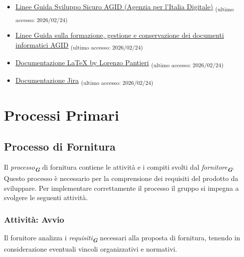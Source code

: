 \documentclass[a4paper,12pt]{article}
\newcommand{\glossario}[1]{\textit{#1}\textsubscript{\textbf{\textit{\textcolor{lightblack}{G}}}}}
\newcommand{\ped}[1]{\textsubscript{#1}}
\begin{document}
\begin{itemize}
\begin{itemize}
            \item \href{https://www.math.unipd.it/~tullio/IS-1/2025/Dispense/T10.pdf}{\ul{https://www.math.unipd.it/~tullio/IS-1/2025/Dispense/T10.pdf}} \ped{(ultimo accesso: 2026/02/24)}
            \item \href{https://www.math.unipd.it/~tullio/IS-1/2025/Dispense/T11.pdf}{\ul{https://www.math.unipd.it/~tullio/IS-1/2025/Dispense/T11.pdf}} \ped{(ultimo accesso: 2026/02/24)}
        \end{itemize}
    \item \href{https://www.agid.gov.it/it/sicurezza/cert-pa/linee-guida-sviluppo-del-software-sicuro}{\ul{Linee Guida Sviluppo Sicuro AGID (Agenzia per l'Italia Digitale)}} \ped{(ultimo accesso: 2026/02/24)}
    \item  \href{https://www.agid.gov.it/it/linee-guida#index-3}{\ul{Linee Guida sulla formazione, gestione e conservazione dei documenti informatici AGID}} \ped{(ultimo accesso: 2026/02/24)}
    \item \href{https://www.lorenzopantieri.net/LaTeX_files/LaTeXpedia.pdf}{\ul{Documentazione \LaTeX{} by Lorenzo Pantieri}} \ped{(ultimo accesso: 2026/02/24)}
    \item \href{https://confluence.atlassian.com/jira}{\ul{Documentazione Jira}} \ped{(ultimo accesso: 2026/02/24)}
\end{itemize}

\section{Processi Primari}

\subsection{Processo di Fornitura}\label{processoDiFornitura}
Il \glossario{processo} di fornitura contiene le attività e i compiti svolti
dal \glossario{fornitore}. Questo processo è necessario per la comprensione dei requisiti del prodotto da sviluppare. Per implementare correttamente il processo il gruppo
si impegna a svolgere le seguenti attività.

\subsubsection{Attività: Avvio}
Il fornitore analizza i \glossario{requisiti} necessari alla proposta di
fornitura, tenendo in considerazione eventuali vincoli organizzativi e
normativi.
\end{document}
